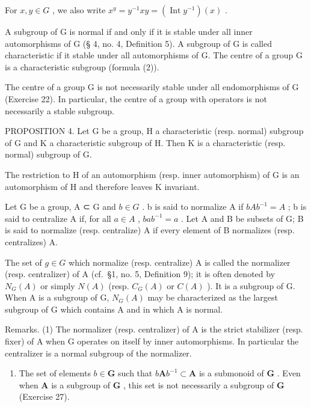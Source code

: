 For \(x, y \in G\) , we also write \(x^y = y^{-1}xy = (\operatorname{Int} y^{-1})(x)\) .

A subgroup of G is normal if and only if it is stable under all inner automorphisms of G (§ 4, no. 4, Definition 5). A subgroup of G is called characteristic if it stable under all automorphisms of G. The centre of a group G is a characteristic subgroup (formula (2)).

The centre of a group G is not necessarily stable under all endomorphisms of G (Exercise 22). In particular, the centre of a group with operators is not necessarily a stable subgroup.

PROPOSITION 4. Let G be a group, H a characteristic (resp. normal) subgroup of G and K a characteristic subgroup of H. Then K is a characteristic (resp. normal) subgroup of G.

The restriction to H of an automorphism (resp. inner automorphism) of G is an automorphism of H and therefore leaves K invariant.

Let G be a group, A ⊂ G and \(b \in G\) . b is said to normalize A if \(bAb^{-1} = A\) ; b is said to centralize A if, for all \(a \in A\) , \(bab^{-1} = a\) . Let A and B be subsets of G; B is said to normalize (resp. centralize) A if every element of B normalizes (resp. centralizes) A.

The set of \(g \in G\) which normalize (resp. centralize) A is called the normalizer (resp. centralizer) of A (cf.~§1, no. 5, Definition 9); it is often denoted by \(N_{G}(A)\) or simply \(N(A)\) (resp. \(C_{G}(A)\) or \(C(A)\) ). It is a subgroup of G. When A is a subgroup of G, \(N_{G}(A)\) may be characterized as the largest subgroup of G which contains A and in which A is normal.

Remarks. (1) The normalizer (resp. centralizer) of A is the strict stabilizer (resp. fixer) of A when G operates on itself by inner automorphisms. In particular the centralizer is a normal subgroup of the normalizer.

\begin{enumerate}
\def\labelenumi{(\arabic{enumi})}
\setcounter{enumi}{1}
\tightlist
\item
  The set of elements \(b \in \mathbf{G}\) such that \(b\mathbf{A}b^{-1} \subset \mathbf{A}\) is a submonoid of \(\mathbf{G}\) . Even when \(\mathbf{A}\) is a subgroup of \(\mathbf{G}\) , this set is not necessarily a subgroup of \(\mathbf{G}\) (Exercise 27).
\end{enumerate}

